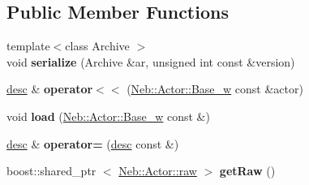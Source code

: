 \subsection*{\-Public \-Member \-Functions}
\begin{DoxyCompactItemize}
\item 
\hypertarget{classNeb_1_1Actor_1_1desc_aa46b5e2700b61f5bea052b88745cb247}{{\footnotesize template$<$class Archive $>$ }\\void {\bfseries serialize} (\-Archive \&ar, unsigned int const \&version)}\label{classNeb_1_1Actor_1_1desc_aa46b5e2700b61f5bea052b88745cb247}

\item 
\hypertarget{classNeb_1_1Actor_1_1desc_a304c0b4a7c670c52d3d34a41fa5f2e01}{\hyperlink{classNeb_1_1Actor_1_1desc}{desc} \& {\bfseries operator$<$$<$} (\hyperlink{classNeb_1_1weak__ptr}{\-Neb\-::\-Actor\-::\-Base\-\_\-w} const \&actor)}\label{classNeb_1_1Actor_1_1desc_a304c0b4a7c670c52d3d34a41fa5f2e01}

\item 
\hypertarget{classNeb_1_1Actor_1_1desc_a90922cca8bd0bdb075b5192b5123ccbf}{void {\bfseries load} (\hyperlink{classNeb_1_1weak__ptr}{\-Neb\-::\-Actor\-::\-Base\-\_\-w} const \&)}\label{classNeb_1_1Actor_1_1desc_a90922cca8bd0bdb075b5192b5123ccbf}

\item 
\hypertarget{classNeb_1_1Actor_1_1desc_a41d8146020d1881e5eab12820264e977}{\hyperlink{classNeb_1_1Actor_1_1desc}{desc} \& {\bfseries operator=} (\hyperlink{classNeb_1_1Actor_1_1desc}{desc} const \&)}\label{classNeb_1_1Actor_1_1desc_a41d8146020d1881e5eab12820264e977}

\item 
\hypertarget{classNeb_1_1Actor_1_1desc_a5d652110b4f6bc979ccfdd0d346c40b7}{boost\-::shared\-\_\-ptr\*
$<$ \hyperlink{classNeb_1_1Actor_1_1raw}{\-Neb\-::\-Actor\-::raw} $>$ {\bfseries get\-Raw} ()}\label{classNeb_1_1Actor_1_1desc_a5d652110b4f6bc979ccfdd0d346c40b7}

\end{DoxyCompactItemize}
